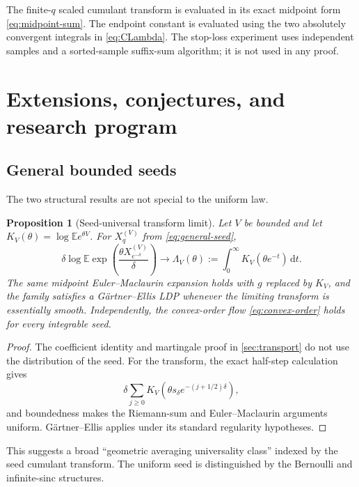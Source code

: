 \documentclass[11pt,a4paper]{article}
\newtheorem{proposition}[theorem]{Proposition}
\theoremstyle{definition}
\newcommand{\E}{\mathbb{E}}
\newcommand{\dd}{\,\mathrm{d}}
\newcommand{\1}{\mathbf{1}}
\begin{document}
The finite-$q$ scaled cumulant transform is evaluated in its exact midpoint
form \eqref{eq:midpoint-sum}.  The endpoint constant is evaluated using the
two absolutely convergent integrals in \eqref{eq:CLambda}.  The stop-loss
experiment uses independent samples and a sorted-sample suffix-sum
algorithm; it is not used in any proof.

\section{Extensions, conjectures, and research program}
\label{sec:future}

\subsection{General bounded seeds}

The two structural results are not special to the uniform law.

\begin{proposition}[Seed-universal transform limit]
\label{prop:general-seed-LDP}
Let $V$ be bounded and let $K_V(\theta)=\log\E e^{\theta V}$.  For
$X_q^{(V)}$ from \eqref{eq:general-seed},
\begin{equation}
 \delta\log\E\exp\!\left(\frac{\theta X_{e^{-\delta}}^{(V)}}{\delta}\right)
 \longrightarrow
 \Lambda_V(\theta):=\int_0^\infty K_V(\theta e^{-t})\dd t.
 \label{eq:general-seed-Lambda}
\end{equation}
The same midpoint Euler--Maclaurin expansion holds with $g$ replaced by
$K_V$, and the family satisfies a G\"artner--Ellis LDP whenever the limiting
transform is essentially smooth.  Independently, the convex-order flow
\eqref{eq:convex-order} holds for every integrable seed.
\end{proposition}

\begin{proof}
The coefficient identity and martingale proof in \cref{sec:transport} do not
use the distribution of the seed.  For the transform, the exact half-step
calculation gives
\[
 \delta\sum_{j\ge0}K_V(\theta s_\delta e^{-(j+1/2)\delta}),
\]
and boundedness makes the Riemann-sum and Euler--Maclaurin arguments
uniform.  G\"artner--Ellis applies under its standard regularity hypotheses.
\end{proof}

This suggests a broad ``geometric averaging universality class'' indexed by
the seed cumulant transform.  The uniform seed is distinguished by the
Bernoulli and infinite-sinc structures.
\end{document}
